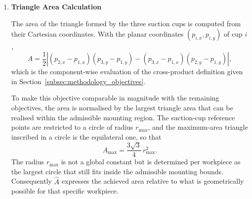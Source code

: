 \begin{enumerate}
Besides the spatial distribution of the grasps, their absolute number is relevant as well, since a
layout that offers more valid grasps is more robust with respect to object pose and surrounding
scene constraints. The evaluated grasp count is taken from the same set that is used for the
diversity metric, i.e.
\begin{equation}
    n_{\mathrm{g}} =
    \begin{cases}
        |\mathcal{H}_{\mathrm{clst}}|,  & \text{if clustering is performed},\\[2pt]
        |\mathcal{H}_{\mathrm{valid}}|, & \text{otherwise}.
    \end{cases}
\end{equation}
To keep this quantity comparable with the remaining objectives, it is expressed relative to the
clustering budget $K_{\mathrm{clst}}$ (\texttt{max\_cluster}), which is the maximum number of grasps
retained by the clustering stage,
\begin{equation}
    \hat{n}_{\mathrm{g}} = \frac{n_{\mathrm{g}}}{K_{\mathrm{clst}}} \in [0,1].
\end{equation}
Since clustering is only applied when more than $K_{\mathrm{clst}}$ valid grasps exist, the
condition $n_{\mathrm{g}} \leq K_{\mathrm{clst}}$ holds in both cases and the ratio is bounded by
unity without further clipping. A value of one indicates that the layout produced at least as many
valid grasps as the clustering budget permits, whereas a value of zero corresponds to a layout for
which no valid grasp was found.

\item \textbf{Triangle Area Calculation}

The area of the triangle formed by the three suction cups is computed from their Cartesian
coordinates. With the planar coordinates $(p_{i,x},p_{i,y})$ of cup $i$,
\begin{equation}
    A =
    \frac{1}{2}
    \left|
        (p_{2,x} - p_{1,x})(p_{3,y} - p_{1,y}) - (p_{3,x} - p_{1,x})(p_{2,y} - p_{1,y})
    \right|,
\end{equation}
which is the component-wise evaluation of the cross-product definition given in
Section~\ref{subsec:methodology_objectives}.

To make this objective comparable in magnitude with the remaining objectives, the area is normalised
by the largest triangle area that can be realised within the admissible mounting region. The
suction-cup reference points are restricted to a circle of radius $r_{\max}$, and the maximum-area
triangle inscribed in a circle is the equilateral one, so that
\begin{equation}
    A_{\max} = \frac{3\sqrt{3}}{4}\, r_{\max}^{2}.
\end{equation}
The radius $r_{\max}$ is not a global constant but is determined per workpiece as the largest circle
that still fits inside the admissible mounting bounds. Consequently $\hat{A}$ expresses the achieved
area relative to what is geometrically possible for that specific workpiece.


\end{enumerate}
